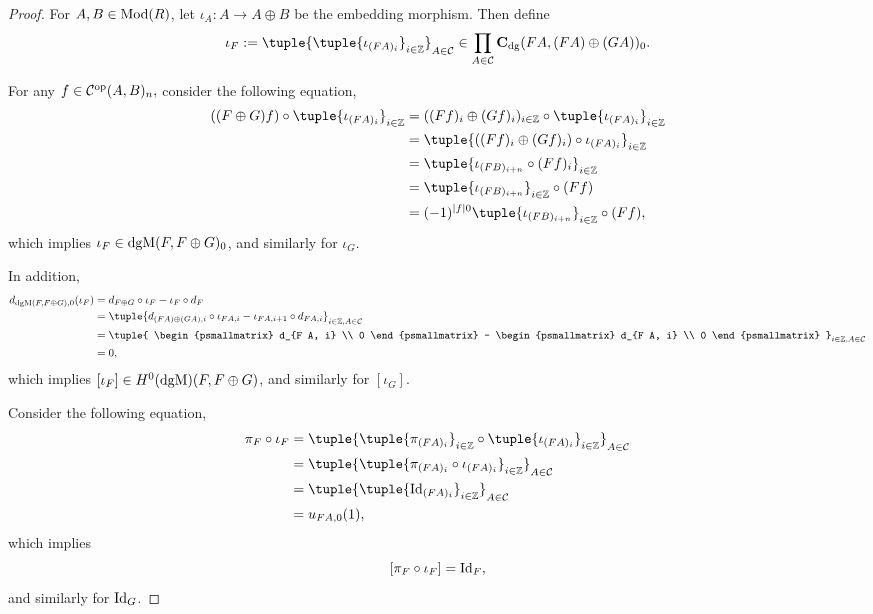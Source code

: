 \begin{proof}
    For \( A, B \in \operatorname{Mod}(R) \), let \( \iota_A: A \to A \oplus B \) be the embedding morphism. Then define
    \[
        \iota_F := \tuple{ \tuple{ \iota_{(F A)_i} }_{i \in \Zb} }_{A \in \Cc} \in \prod_{A \in \Cc} \C_{\dg}(F A, (F A) \oplus (G A) )_0.
    \]

    For any \( f \in {\mathcal{C}}^{\operatorname{op}}(A, B)_n, \) consider the following equation,
    \begin{align*}
        ((F \oplus G) f) \circ \tuple{ \iota_{(F A)_i} }_{i \in \Zb} &= ((F f)_i \oplus (G f)_i)_{i \in \Zb} \circ \tuple{ \iota_{(F A)_i} }_{i \in \Zb} \\
        &= \tuple{ ((F f)_i \oplus (G f)_i) \circ \iota_{(F A)_i} }_{i \in \Zb} \\
        &= \tuple{ \iota_{(F B)_{i + n}} \circ (F f)_i  }_{i \in \Zb} \\
        &= \tuple{ \iota_{(F B)_{i + n}} }_{i \in \Zb} \circ (F f) \\
        &= (-1)^{|f| 0}\tuple{ \iota_{(F B)_{i + n}} }_{i \in \Zb} \circ (F f), \\
    \end{align*}
    which implies \( \iota_F \in \operatorname{dgM}(F, F \oplus G)_0 \), and similarly for \( \iota_G \).

    In addition,
    \begin{align*}
        d_{\dgM(F, F \oplus G), 0} ( \iota_F ) &= d_{F \oplus G} \circ \iota_F - \iota_F \circ d_F \\
        &= \tuple{ d_{(F A) \oplus (G A), i} \circ \iota_{F A, i} - \iota_{F A, i + 1} \circ d_{F A, i} }_{i \in \Zb, A \in \Cc} \\
        &= \tuple{
            \begin{psmallmatrix}
                d_{F A, i} \\
                0
            \end{psmallmatrix}
            -
            \begin{psmallmatrix}
                d_{F A, i} \\
                0
            \end{psmallmatrix}
        }_{i \in \Zb, A \in \Cc} \\
        &= 0,
    \end{align*}
    which implies \( [\iota_F] \in H^0(\operatorname{dgM})(F, F \oplus G) \), and similarly for \( [\iota_G] \).

    Consider the following equation,
    \begin{align*}
        \pi_F \circ \iota_F &= \tuple{ \tuple{ \pi_{(F A)_i} }_{i \in \Zb} \circ \tuple{ \iota_{(F A)_i} }_{i \in \Zb} }_{A \in \Cc} \\
        &= \tuple{ \tuple{ \pi_{(F A)_i} \circ \iota_{(F A)_i} }_{i \in \Zb} }_{A \in \Cc} \\
        &= \tuple{ \tuple{ \Id_{(F A)_i} }_{i \in \Zb} }_{A \in \Cc} \\
        &= u_{F A, 0}(1),
    \end{align*}
    which implies
    \[
        [\pi_F \circ \iota_F] = \operatorname{Id}_F,
    \]
    and similarly for \( \operatorname{Id}_G \).
    

\end{proof}
